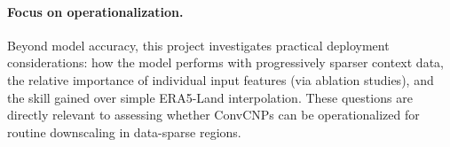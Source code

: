 \paragraph{Focus on operationalization.} Beyond model accuracy, this project investigates practical deployment considerations: how the model performs with progressively sparser context data, the relative importance of individual input features (via ablation studies), and the skill gained over simple ERA5-Land interpolation. These questions are directly relevant to assessing whether ConvCNPs can be operationalized for routine downscaling in data-sparse regions.